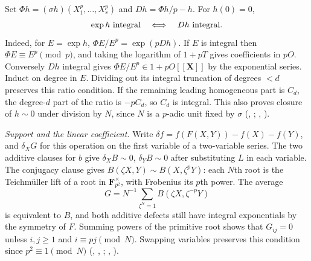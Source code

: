 Set $\Phi h=(\sigma h)(X_1^p,\ldots,X_s^p)$ and
$Dh=\Phi h/p-h$. For $h(0)=0$,
\[
              \exp h\ \hbox{integral}\quad\Longleftrightarrow\quad
              Dh\ \hbox{integral}.
\]
Indeed, for $E=\exp h$, $\Phi E/E^p=\exp(pDh)$. If $E$ is integral
then $\Phi E\equiv E^p\pmod p$, and taking the logarithm of
$1+pT$ gives coefficients in $pO$. Conversely $Dh$ integral gives
$\Phi E/E^p\in1+pO[[\mathbf X]]$ by the exponential series.
Induct on degree in $E$. Dividing out its integral truncation of
degrees $<d$ preserves this ratio condition. If the remaining leading
homogeneous part is $C_d$, the degree-$d$ part of the ratio is $-pC_d$,
so $C_d$ is integral. This also proves closure of $h\sim0$ under
division by $N$, since $N$ is a $p$-adic unit fixed by $\sigma$
(, ;
, ).

\emph{Support and the linear coefficient.} Write
$\delta f=f(F(X,Y))-f(X)-f(Y)$, and $\delta_X G$ for this operation
on the first variable of a two-variable series. The two additive
clauses for $b$ give $\delta_X B\sim0$, $\delta_Y B\sim0$ after
substituting $L$ in each variable. The conjugacy clause gives
$B(\zeta X,Y)\sim B(X,\zeta^pY)$: each $N$th root is the
Teichm\"uller lift of a root in $\mathbf F_{p^2}^\times$, with
Frobenius its $p$th power. The average
\[
 G=N^{-1}\sum_{\zeta^N=1} B(\zeta X,\zeta^{-p}Y)
\]
is equivalent to $B$, and both additive defects still have integral
exponentials by the symmetry of $F$. Summing powers of the primitive
root shows that $G_{ij}=0$ unless $i,j\ge1$ and $i\equiv pj\pmod N$.
Swapping variables preserves this condition since $p^2\equiv1\pmod N$
(, , ;
, ).

